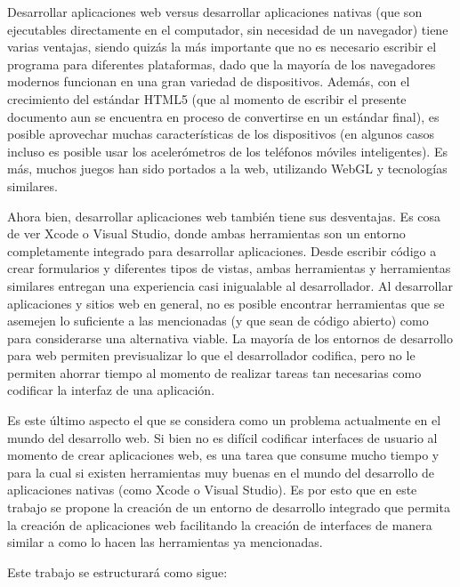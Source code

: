 \documentclass[12pt,titlepage,]{article}
\begin{document}
Desarrollar aplicaciones web versus desarrollar aplicaciones nativas
(que son ejecutables directamente en el computador, sin necesidad de un
navegador) tiene varias ventajas, siendo quizás la más importante que no
es necesario escribir el programa para diferentes plataformas, dado que
la mayoría de los navegadores modernos funcionan en una gran variedad de
dispositivos. Además, con el crecimiento del estándar HTML5 (que al
momento de escribir el presente documento aun se encuentra en proceso de
convertirse en un estándar final), es posible aprovechar muchas
características de los dispositivos (en algunos casos incluso es posible
usar los acelerómetros de los teléfonos móviles inteligentes). Es más,
muchos juegos han sido portados a la web, utilizando WebGL y tecnologías
similares.

Ahora bien, desarrollar aplicaciones web también tiene sus desventajas.
Es cosa de ver Xcode o Visual Studio, donde ambas herramientas son un
entorno completamente integrado para desarrollar aplicaciones. Desde
escribir código a crear formularios y diferentes tipos de vistas, ambas
herramientas y herramientas similares entregan una experiencia casi
inigualable al desarrollador. Al desarrollar aplicaciones y sitios web
en general, no es posible encontrar herramientas que se asemejen lo
suficiente a las mencionadas (y que sean de código abierto) como para
considerarse una alternativa viable. La mayoría de los entornos de
desarrollo para web permiten previsualizar lo que el desarrollador
codifica, pero no le permiten ahorrar tiempo al momento de realizar
tareas tan necesarias como codificar la interfaz de una aplicación.

Es este último aspecto el que se considera como un problema actualmente
en el mundo del desarrollo web. Si bien no es difícil codificar
interfaces de usuario al momento de crear aplicaciones web, es una tarea
que consume mucho tiempo y para la cual si existen herramientas muy
buenas en el mundo del desarrollo de aplicaciones nativas (como Xcode o
Visual Studio). Es por esto que en este trabajo se propone la creación
de un entorno de desarrollo integrado que permita la creación de
aplicaciones web facilitando la creación de interfaces de manera similar
a como lo hacen las herramientas ya mencionadas.

Este trabajo se estructurará como sigue:
\end{document}
